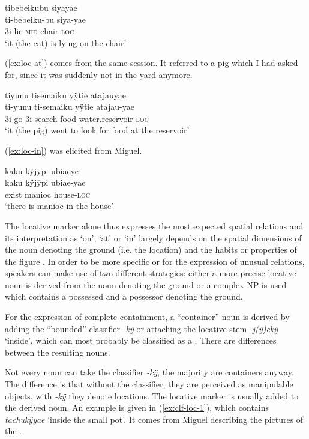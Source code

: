 \ea\label{ex:loc-on}
\begingl
\glpreamble tibebeikubu siyayae\\
\gla ti-bebeiku-bu siya-yae\\
\glb 3i-lie-\textsc{mid} chair-\textsc{loc}\\
\glft ‘it (the cat) is lying on the chair’
\endgl
\trailingcitation{[rxx-e181024l]}%
\xe

(\ref{ex:loc-at}) comes from the same session. It referred to a pig which I had asked for, since it was suddenly not in the yard anymore.

\ea\label{ex:loc-at}
\begingl
\glpreamble tiyunu tisemaiku yÿtie atajauyae\\
\gla ti-yunu ti-semaiku yÿtie atajau-yae\\
\glb 3i-go 3i-search food water.reservoir-\textsc{loc}\\
\glft ‘it (the pig) went to look for food at the reservoir’
\endgl
\trailingcitation{[rxx-e181024l]}%
\xe


(\ref{ex:loc-in}) was elicited from Miguel.

\ea\label{ex:loc-in}
\begingl
\glpreamble kaku kÿjÿpi ubiaeye\\
\gla kaku kÿjÿpi ubiae-yae\\
\glb exist manioc house-\textsc{loc}\\
\glft ‘there is manioc in the house’
\endgl
\trailingcitation{[mxx-e160811sd.073]}%
\xe

The locative marker alone thus expresses the most expected spatial relations and its interpretation as ‘on’, ‘at’ or ‘in’ largely depends on the spatial dimensions of the noun denoting the ground (i.e. the location) and the habits or properties of the figure \citep[cf.][69]{Admiraal2016}. In order to be more specific or for the expression of unusual relations, speakers can make use of two different strategies: either a more precise locative noun is derived from the noun denoting the ground or a complex NP is used which contains a possessed  and a possessor denoting the ground.

For the expression of complete containment, a “container” noun is derived by adding the “bounded” classifier \textit{-kÿ} or attaching the locative stem \textit{-j(ÿ)ekÿ} ‘inside’, which can most probably be classified as a . There are differences between the resulting nouns.

Not every noun can take the classifier \textit{-kÿ}, the majority are containers anyway. The difference is that without the classifier, they are perceived as manipulable objects, with \textit{-kÿ} they denote locations. The locative marker is usually added to the derived noun. An example is given in (\ref{ex:clf-loc-1}), which contains \textit{tachukÿyae} ‘inside the small pot’. It comes from Miguel describing the pictures of the .

